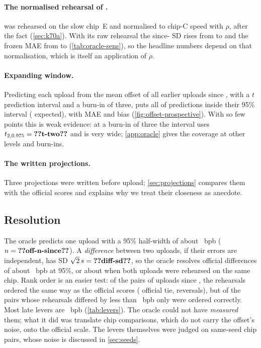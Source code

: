 \paragraph{The normalised rehearsal of .}  was rehearsed on the slow chip~E and normalised to
chip-C speed with $\rho$, after the fact (\cref{sec:k70a}). With its raw rehearsal the since- SD rises from
 to  and the frozen MAE from  to 
(\cref{tab:oracle-sens}), so the headline numbers depend on that normalisation, which is itself an application of
$\rho$.

\paragraph{Expanding window.} Predicting each upload from the mean offset of all earlier uploads since ,
with a $t$ prediction interval and a burn-in of three, puts all  of  predictions inside
their 95\% interval ( expected), with MAE  and bias 
(\cref{fig:offset-prospective}). With so few points this is weak evidence: at a burn-in of three the interval uses
$t_{2,0.975}=\val{t-two}$ and is very wide; \cref{app:oracle} gives the coverage at other levels and burn-ins.

\paragraph{The written projections.} Three projections were written before upload; \cref{sec:projections}
compares them with the official scores and explains why we treat their closeness as anecdote.

\subsection{Resolution}
\label{sec:resolution}

The oracle predicts one upload with a 95\% half-width of about ~bpb ($n=\val{off-n-since}$). A
\emph{difference} between two uploads, if their errors are independent, has SD $\sqrt2\,s=\val{diff-sd}$, so the
oracle resolves official differences of about ~bpb at 95\%, or about  when both
uploads were rehearsed on the same chip. Rank order is an easier test: of the  pairs of uploads since
, the rehearsals ordered  the same way as the official scores ( official tie,
 reversals), but of the  pairs whose rehearsals differed by less than
~bpb only  were ordered correctly. Most late levers are ~bpb (\cref{tab:levers}). The oracle could
not have \emph{measured} them; what it did was translate chip comparisons, which do not carry the offset's noise,
onto the official scale. The levers themselves were judged on same-seed chip pairs, whose noise is discussed in
\cref{sec:seeds}.

